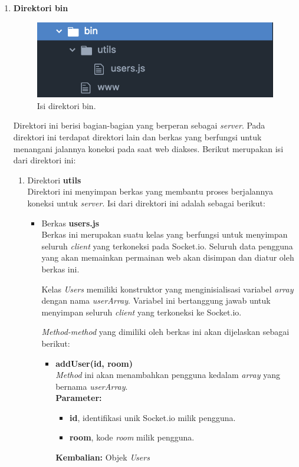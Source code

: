 \begin{enumerate}
	\item \textbf{Direktori bin} \\
	
	\begin{figure}[H]
		\centering
		\includegraphics[scale=0.4]{Gambar/direktori_bin}
		\caption{Isi direktori bin.}
		\label{fig:direktori_bin}
	\end{figure}
	
	Direktori ini berisi bagian-bagian yang berperan sebagai \textit{server}. Pada direktori ini terdapat direktori lain dan berkas yang berfungsi untuk menangani jalannya koneksi pada saat web diakses. Berikut merupakan isi dari direktori ini:
	\begin{enumerate}
		\item Direktori \textbf{utils} \\
		Direktori ini menyimpan berkas yang membantu proses berjalannya koneksi untuk \textit{server}. Isi dari direktori ini adalah sebagai berikut:
		\begin{itemize}
			\item Berkas \textbf{users.js}  \\
			Berkas ini merupakan suatu kelas yang berfungsi untuk menyimpan seluruh \textit{client} yang terkoneksi pada Socket.io. Seluruh data pengguna yang akan memainkan permainan web akan disimpan dan diatur oleh berkas ini.
			
			Kelas \textit{Users} memiliki konstruktor yang menginisialisasi variabel \textit{array} dengan nama \textit{userArray}. Variabel ini bertanggung jawab untuk menyimpan seluruh \textit{client} yang terkoneksi ke Socket.io.
			
			\textit{Method-method} yang dimiliki oleh berkas ini akan dijelaskan sebagai berikut:
			\begin{itemize}
				\item \textbf{addUser(id, room)} \\
				\textit{Method} ini akan menambahkan pengguna kedalam \textit{array} yang bernama \textit{userArray}. \\
				\textbf{Parameter:}
				\begin{itemize}
					\item \textbf{id}, identifikasi unik Socket.io milik pengguna.
					\item \textbf{room}, kode \textit{room} milik pengguna.
				\end{itemize}
				\textbf{Kembalian:} Objek \textit{Users}
				

\end{itemize}
\end{itemize}
\end{enumerate}
\end{enumerate}

